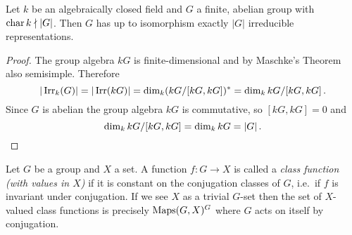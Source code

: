 

\begin{corollary}\label{corollary: number of irreducible representations of finite abelian group}
  Let $k$ be an algebraically closed field and $G$ a finite, abelian group with $\operatorname{char} k \nmid |G|$.
  Then $G$ has up to isomorphism exactly $|G|$ irreducible representations.
\end{corollary}
\begin{proof}
  The group algebra $kG$ is finite-dimensional and by Maschke’s Theorem also semisimple.
  Therefore
  \[
      |\operatorname{Irr}_k(G)|
    = |\operatorname{Irr}(kG)|
    = \dim_k (kG/[kG, kG])^*
    = \dim_k kG/[kG, kG] \,.
  \]
  Since $G$ is abelian the group algebra $kG$ is commutative, so $[kG,kG] = 0$ and
  \[
      \dim_k kG/[kG, kG]
    = \dim_k kG
    = |G| \,.
    \qedhere
  \]
\end{proof}


\begin{definition}
  Let $G$ be a group and $X$ a set.
  A function $f \colon G \to X$ is called a \emph{class function (with values in $X$)} if it is constant on the conjugation classes of $G$, i.e.\ if $f$ is invariant under conjugation.
  If we see $X$ as a trivial $G$-set then the set of $X$-valued class functions is precisely $\operatorname{Maps}(G,X)^G$ where $G$ acts on itself by conjugation.
\end{definition}


